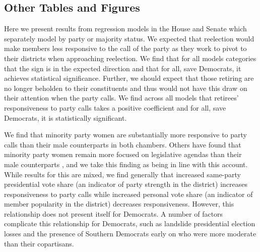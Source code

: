 \documentclass[12pt]{article}
\begin{document}
\clearpage

\subsection*{Other Tables and Figures}
%

Here we present results from regression models in the House and Senate which separately model by party or majority status. We expected that reelection would make members less responsive to the call of the party as they work to pivot to their districts when approaching reelection. We find that for all models categories that the sign is in the expected direction and that for all, save Democrats, it achieves statistical significance. Further, we should expect that those retiring are no longer beholden to their constituents and thus would not have this draw on their attention when the party calls. We find across all models that retirees' responsiveness to party calls takes a positive coefficient and for all, save Democrats, it is statistically significant.

We find that minority party women are substantially more responsive to party calls than their male counterparts in both chambers. Others have found that minority party women remain more focused on legislative agendas than their male counterparts \cite{Volden:2013}, and we take this finding as being in line with this account. While results for this are mixed, we find generally that increased same-party presidential vote share (an indicator of party strength in the district) increases responsiveness to party calls while increased personal vote share (an indicator of member popularity in the district) decreases responsiveness. However, this relationship does not present itself for Democrats. A number of factors complicate this relationship for Democrats, such as landslide presidential election losses and the presence of Southern Democrats early on who were more moderate than their copartisans.
\end{document}
